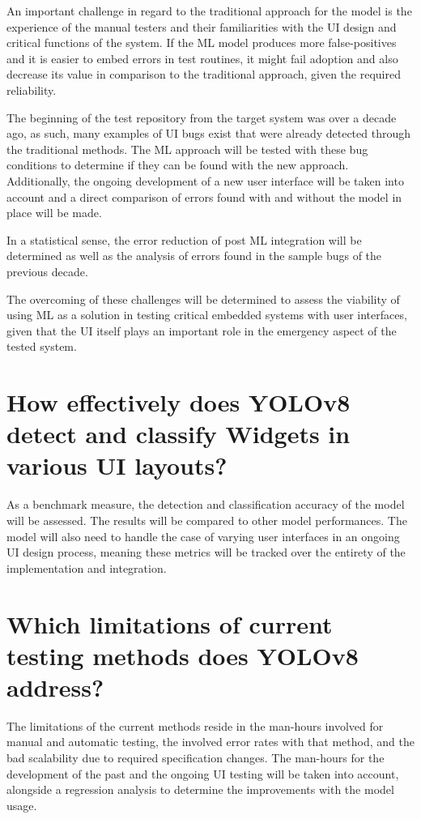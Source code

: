 \documentclass[Proposal,BIC,english,IEEE]{BASE/twbook} %
\begin{document}
An important challenge in regard to the traditional approach for the model is the experience of the manual testers and their familiarities with the UI design and critical functions of the system.
If the ML model produces more false-positives and it is easier to embed errors in test routines, it might fail adoption and also decrease its value in comparison to the traditional approach, given the required reliability.

The beginning of the test repository from the target system was over a decade ago, as such, many examples of UI bugs exist that were already detected through the traditional methods.
The ML approach will be tested with these bug conditions to determine if they can be found with the new approach. Additionally, the ongoing development of a new user interface will be taken into account and a direct comparison of errors found with and without the model in place will be made.

In a statistical sense, the error reduction of post ML integration will be determined as well as the analysis of errors found in the sample bugs of the previous decade.

The overcoming of these challenges will be determined to assess the viability of using ML as a solution in testing critical embedded systems with user interfaces, given that the UI itself plays an important role in the emergency aspect of the tested system.

\section{How effectively does YOLOv8 detect and classify Widgets in various UI layouts?}
As a benchmark measure, the detection and classification accuracy of the model will be assessed. The results will be compared to other model performances.
The model will also need to handle the case of varying user interfaces in an ongoing UI design process, meaning these metrics will be tracked over the entirety of the implementation and integration.

\section{Which limitations of current testing methods does YOLOv8 address?}
The limitations of the current methods reside in the man-hours involved for manual and automatic testing, the involved error rates with that method, and the bad scalability due to required specification changes.
The man-hours for the development of the past and the ongoing UI testing will be taken into account, alongside a regression analysis to determine the improvements with the model usage.
\newpage
\end{document}
